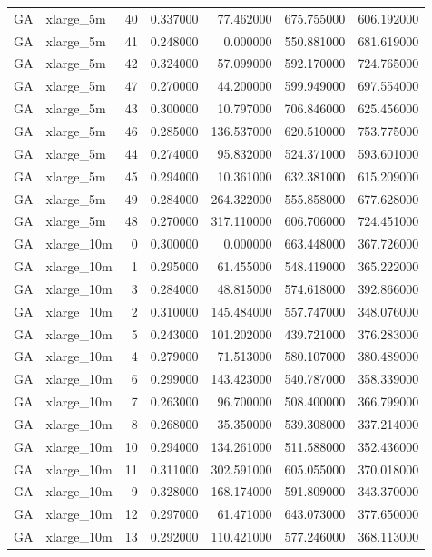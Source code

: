 \begin{tabular}{llrrrrr}
GA & xlarge_5m & 40 & 0.337000 & 77.462000 & 675.755000 & 606.192000 \\
GA & xlarge_5m & 41 & 0.248000 & 0.000000 & 550.881000 & 681.619000 \\
GA & xlarge_5m & 42 & 0.324000 & 57.099000 & 592.170000 & 724.765000 \\
GA & xlarge_5m & 47 & 0.270000 & 44.200000 & 599.949000 & 697.554000 \\
GA & xlarge_5m & 43 & 0.300000 & 10.797000 & 706.846000 & 625.456000 \\
GA & xlarge_5m & 46 & 0.285000 & 136.537000 & 620.510000 & 753.775000 \\
GA & xlarge_5m & 44 & 0.274000 & 95.832000 & 524.371000 & 593.601000 \\
GA & xlarge_5m & 45 & 0.294000 & 10.361000 & 632.381000 & 615.209000 \\
GA & xlarge_5m & 49 & 0.284000 & 264.322000 & 555.858000 & 677.628000 \\
GA & xlarge_5m & 48 & 0.270000 & 317.110000 & 606.706000 & 724.451000 \\
GA & xlarge_10m & 0 & 0.300000 & 0.000000 & 663.448000 & 367.726000 \\
GA & xlarge_10m & 1 & 0.295000 & 61.455000 & 548.419000 & 365.222000 \\
GA & xlarge_10m & 3 & 0.284000 & 48.815000 & 574.618000 & 392.866000 \\
GA & xlarge_10m & 2 & 0.310000 & 145.484000 & 557.747000 & 348.076000 \\
GA & xlarge_10m & 5 & 0.243000 & 101.202000 & 439.721000 & 376.283000 \\
GA & xlarge_10m & 4 & 0.279000 & 71.513000 & 580.107000 & 380.489000 \\
GA & xlarge_10m & 6 & 0.299000 & 143.423000 & 540.787000 & 358.339000 \\
GA & xlarge_10m & 7 & 0.263000 & 96.700000 & 508.400000 & 366.799000 \\
GA & xlarge_10m & 8 & 0.268000 & 35.350000 & 539.308000 & 337.214000 \\
GA & xlarge_10m & 10 & 0.294000 & 134.261000 & 511.588000 & 352.436000 \\
GA & xlarge_10m & 11 & 0.311000 & 302.591000 & 605.055000 & 370.018000 \\
GA & xlarge_10m & 9 & 0.328000 & 168.174000 & 591.809000 & 343.370000 \\
GA & xlarge_10m & 12 & 0.297000 & 61.471000 & 643.073000 & 377.650000 \\
GA & xlarge_10m & 13 & 0.292000 & 110.421000 & 577.246000 & 368.113000 \\

\end{tabular}
